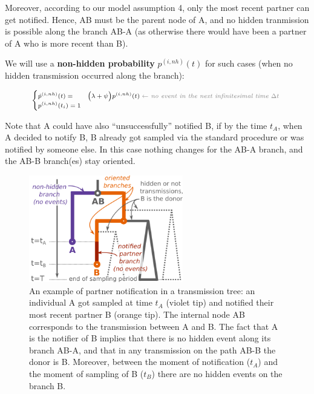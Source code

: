 \documentclass[a4paper,10pt]{article}
\begin{document}
Moreover, according to our model assumption 4, only the most recent partner can get notified. Hence, AB must be the parent node of A, and no hidden tranmission is possible along the branch AB-A (as otherwise there would have been a partner of A who is more recent than B).

We will use a \textbf{non-hidden probability} $p^{(i,nh)}(t)$ for such cases (when no hidden transmission occurred along the branch):

\begin{equation}
\scriptsize
\begin{cases}
\dot{p}^{(i,nh)}(t) = & \Big(\lambda + \psi\Big) p^{(i,nh)}(t)\; \textit{\color{gray} $\leftarrow$ no event in the next infinitesimal time $\Delta t$ }\\
p^{(i,nh)}(t_i) = 1\label{eq:p-nh}
\end{cases}
\end{equation}

Note that A could have also ``unsuccessfully'' notified B, if by the time $t_A$, when A decided to notify B, B already got sampled via the standard procedure or was notified by someone else. In this case nothing changes for the AB-A branch, and the AB-B branch(es) stay oriented. 


\begin{figure}[tbhp]
\centering 
\includegraphics[width=0.6\textwidth]{Fig_PNbranches}
\caption{An example of partner notification in a transmission tree: an individual A got sampled at time $t_A$ (violet tip) and notified their most recent partner B (orange tip). The internal node AB corresponds to the transmission between A and B. The fact that A is the notifier of B implies that there is no hidden event along its branch AB-A, and that in any transmission on the path AB-B the donor is B. Moreover, between the moment of notification ($t_A$) and the moment of sampling  of B ($t_B$) there are no hidden events on the branch B.}
\label{fig:pn-branches} 
\end{figure}
\end{document}
